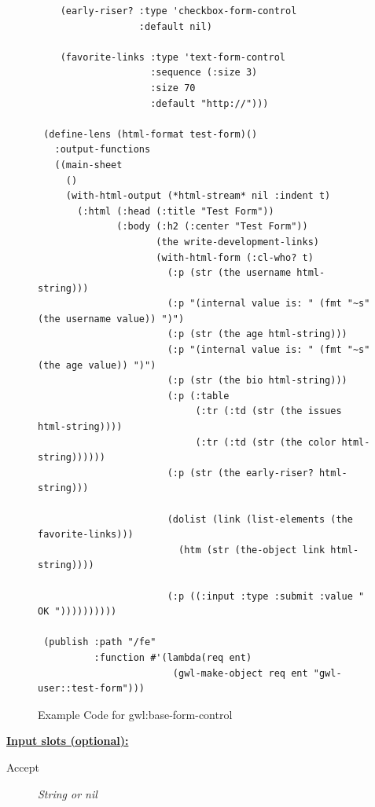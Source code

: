 \documentclass [11pt]{book}
\begin{document}
\begin{itemize}
\begin{figure}
\begin{lrbox}{\boxedverb}
\begin{minipage}{\linewidth}
{\begin{verbatim}
    (early-riser? :type 'checkbox-form-control
                  :default nil)
   
    (favorite-links :type 'text-form-control
                    :sequence (:size 3)
                    :size 70
                    :default "http://")))

 (define-lens (html-format test-form)()
   :output-functions
   ((main-sheet
     ()
     (with-html-output (*html-stream* nil :indent t)
       (:html (:head (:title "Test Form"))
              (:body (:h2 (:center "Test Form"))
                     (the write-development-links)
                     (with-html-form (:cl-who? t)
                       (:p (str (the username html-string)))
                       (:p "(internal value is: " (fmt "~s" (the username value)) ")")
                       (:p (str (the age html-string)))
                       (:p "(internal value is: " (fmt "~s" (the age value)) ")")
                       (:p (str (the bio html-string)))
                       (:p (:table 
                            (:tr (:td (str (the issues html-string))))
                            (:tr (:td (str (the color html-string))))))
                       (:p (str (the early-riser? html-string)))
                      
                       (dolist (link (list-elements (the favorite-links)))
                         (htm (str (the-object link html-string))))
                      
                       (:p ((:input :type :submit :value " OK "))))))))))
 
 (publish :path "/fe"
          :function #'(lambda(req ent)
                        (gwl-make-object req ent "gwl-user::test-form")))

\end{verbatim}}
\end{minipage}
\end{lrbox}
\fbox{\usebox{\boxedverb}}

\caption{Example Code for gwl:base-form-control}

\label{fig:example-code-gwl:base-form-control}

\end{figure}





\textbf{
\underline{Input slots (optional):}}

\begin{description}

\item [Accept]
\emph{String or nil}


\end{description}
\end{itemize}
\end{document}
